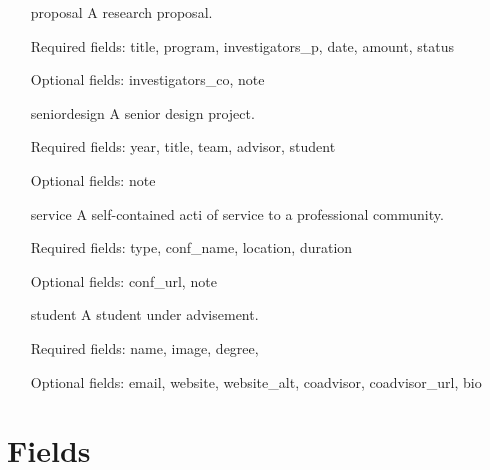 \documentclass[11pt,letterpaper]{article}
\newcommand{\entry}[1]{\textsf{#1}}
\newcommand{\field}[1]{\textsf{#1}}
\begin{document}
\begin{itemize}
  \item[\entry{proposal}] A research proposal.
    
    Required fields:
    \field{title},
    \field{program},
    \field{investigators\_p},
    \field{date},
    \field{amount},
    \field{status}

    Optional fields:
    \field{investigators\_co},
    \field{note}

  \item[\entry{seniordesign}] A senior design project.
    
    Required fields:
    \field{year},
    \field{title},
    \field{team},
    \field{advisor},
    \field{student}

    Optional fields:
    \field{note}

  \item[\entry{service}] A self-contained acti of service to a professional community.

    Required fields:
    \field{type},
    \field{conf\_name},
    \field{location},
    \field{duration}

    Optional fields:
    \field{conf\_url},
    \field{note}

  \item[\entry{student}] A student under advisement.
 
    Required fields:
    \field{name},
    \field{image},
    \field{degree},

    Optional fields:
    \field{email},
    \field{website},
    \field{website\_alt},
    \field{coadvisor},
    \field{coadvisor\_url},
    \field{bio}
\end{itemize}


\section{Fields}\label{sec:fields}
\end{document}
